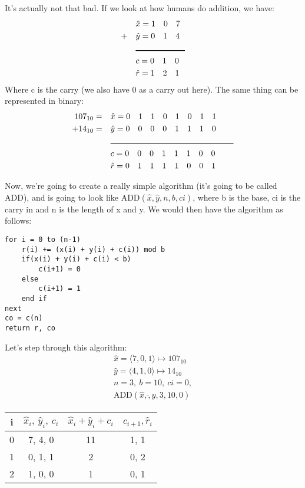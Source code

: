\documentclass[11pt,a4paper,titlepage,dvipsnames,cmyk]{scrartcl}
\begin{document}
It's actually not that bad. If we look at how humans do addition, we have:
\begin{align*}
    &\hat x = 1 \quad 0 \quad 7 \\
    + \quad &\hat y = 0 \quad 1 \quad 4 \\
        &\rule{60pt}{1pt} \\
           &c = 0 \quad 1 \quad 0 \\
           &\hat r = 1 \quad 2 \quad 1
\end{align*}
Where c is the carry (we also have 0 as a carry out here). The same thing can be
represented in binary:
\begin{align*}
    107_{10} = \quad &\hat x = 0 \quad 1 \quad 1 \quad 0 \quad 1 \quad 0 \quad 1 \quad
    1 \\
    + 14_{10} = \quad &\hat y = 0 \quad 0 \quad 0 \quad 0 \quad 1 \quad 1 \quad 1
    \quad 0 \\
      &\rule{150pt}{1pt} \\
      &c = 0 \quad 0 \quad 0 \quad 1 \quad 1 \quad 1 \quad 0 \quad 0 \\
      &\hat r = 0 \quad 1 \quad 1 \quad 1 \quad 1 \quad 0 \quad 0 \quad 1
\end{align*}

Now, we're going to create a really simple algorithm (it's going to be called
ADD), and is going to look like $\text{ADD}(\hat x, \hat y, n, b, ci)$, where b
is the base, ci is the carry in and n is the length of x and y. We would then
have the algorithm as follows:
\begin{lstlisting}[]
for i = 0 to (n-1)
    r(i) += (x(i) + y(i) + c(i)) mod b
    if(x(i) + y(i) + c(i) < b)
        c(i+1) = 0
    else
        c(i+1) = 1
    end if
next
co = c(n)
return r, co
\end{lstlisting}

Let's step through this algorithm:
\begin{gather*}
    \hat x = \langle 7, 0, 1 \rangle \mapsto 107_{10} \\
    \hat y = \langle 4, 1, 0 \rangle \mapsto 14_{10} \\
    n = 3, \ b = 10, \ ci = 0, \\
    \text{ADD}(\hat x, \hat, y, 3, 10, 0)
\end{gather*}

\begin{center}
    \begin{tabular}{|c|c|c|c|}
        \hline
        i & $\hat x_i, \ \hat y_i, \ c_i$ & $\hat x_i + \hat y_i + c_i$ &
        $c_{i+1}, \hat r_i$\\
        \hline
        0 & 7, 4, 0 & 11 & 1, 1 \\
        \hline
        1 & 0, 1, 1 & 2 & 0, 2 \\
        \hline
        2 & 1, 0, 0 & 1 & 0, 1 \\
        \hline
    \end{tabular}
\end{center}
\end{document}
